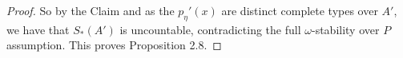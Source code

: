 \documentclass[10pt,a4paper]{amsart}
\begin{document}
\begin{proof}
So by the Claim and as the $p_{\eta}'(x)$ are distinct complete types over $A'$, we have that $S_{*}(A')$ is uncountable, contradicting the full $\omega$-stability over $P$ assumption.
This proves Proposition 2.8. 

\end{proof} 
\end{document}

